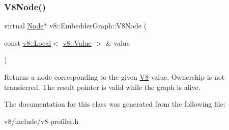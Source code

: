 \subsubsection{\texorpdfstring{V8\+Node()}{V8Node()}}
{\footnotesize\ttfamily virtual \mbox{\hyperlink{classv8_1_1EmbedderGraph_1_1Node}{Node}}$\ast$ v8\+::\+Embedder\+Graph\+::\+V8\+Node (\begin{DoxyParamCaption}\item[{const \mbox{\hyperlink{classv8_1_1Local}{v8\+::\+Local}}$<$ \mbox{\hyperlink{classv8_1_1Value}{v8\+::\+Value}} $>$ \&}]{value }\end{DoxyParamCaption})\hspace{0.3cm}{\ttfamily [pure virtual]}}

Returns a node corresponding to the given \mbox{\hyperlink{classv8_1_1V8}{V8}} value. Ownership is not transferred. The result pointer is valid while the graph is alive. 

The documentation for this class was generated from the following file\+:\begin{DoxyCompactItemize}
\item 
v8/include/v8-\/profiler.\+h\end{DoxyCompactItemize}
